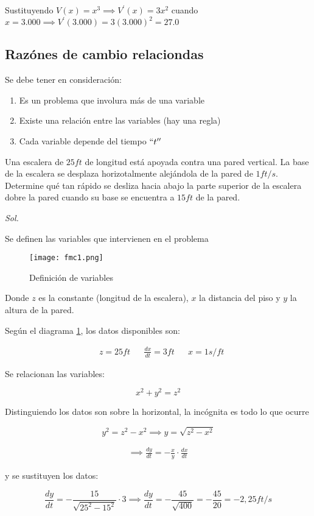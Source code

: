 Sustituyendo $V(x)=x^3 \implies V^{\prime}(x)=3x^2$ cuando $x=3.000\implies V^{\prime}(3.000)=3(3.000)^2=27.0$


\subsection{Razónes de cambio relaciondas}

Se debe tener en consideración:

\begin{enumerate}
	\item Es un problema que involura más de una variable
	\item Existe una relación entre las variables (hay una regla)
	\item Cada variable depende del tiempo $``t''$
\end{enumerate}


\begin{example}
	Una escalera de $25ft$ de longitud está apoyada contra una pared vertical. La base de la escalera se desplaza horizotalmente alejándola de la pared de $1ft/s$. Determine qué tan rápido se desliza hacia abajo la parte superior de la escalera dobre la pared cuando su base se encuentra a $15ft$ de la pared.
\end{example}

\textit{ Sol. }

Se definen las variables que intervienen en el problema

\begin{figure}[h!]
	\centerline{\texttt{[image: fmc1.png]}}
	\caption{Definición de variables}
	\label{fmc1}
\end{figure}

Donde $z$ es la constante (longitud de la escalera), $x$ la distancia del piso y $y$ la altura de la pared.

Según el diagrama \ref{fmc1}, los datos disponibles son:

\begin{align*}
	 & z=25ft &  & \frac{dx}{dt}=3ft &  & x=1s/ft
\end{align*}

Se relacionan las variables:

\begin{equation*}
	x^2+y^2=z^2
\end{equation*}

Distinguiendo los datos son sobre la horizontal, la incógnita es todo lo que ocurre

\begin{equation*}
	y^2=z^2-x^2\implies y=\sqrt{z^2-x^2}
\end{equation*}


\begin{align*}
	\implies \frac{dy}{dt}=-\frac{x}{y}\cdot \frac{dx}{dt}
\end{align*}

y se sustituyen los datos:

\begin{equation*}
	\frac{dy}{dt}=-\frac{15}{\sqrt{25^2-15^2}}\cdot 3\implies \frac{dy}{dt}=-\frac{45}{\sqrt{400}}=-\frac{45}{20}=-2,25 ft/s
\end{equation*}
